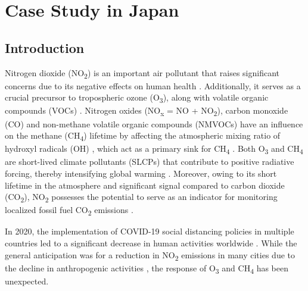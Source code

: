 \section{Case Study in Japan} \label{chap3_s2}

\subsection{Introduction}
Nitrogen dioxide (NO\textsubscript{2}) is an important air pollutant that raises significant concerns due to its negative effects on human health \citep{hamra2015lung}. Additionally, it serves as a crucial precursor to tropospheric ozone (O\textsubscript{3}), along with volatile organic compounds (VOCs) \citep{akimoto2022rethinking}. Nitrogen oxides (NO\textsubscript{x} = NO + NO\textsubscript{2}), carbon monoxide (CO) and non-methane volatile organic compounds (NMVOCs) have an influence on the methane (CH\textsubscript{4}) lifetime by affecting the atmospheric mixing ratio of hydroxyl radicals (OH) \citep{akimoto2022rethinking}, which act as a primary sink for CH\textsubscript{4} \citep{turner2019interpreting}. Both O\textsubscript{3} and CH\textsubscript{4} are short-lived climate pollutants (SLCPs) that contribute to positive radiative forcing, thereby intensifying global warming \citep{akimoto2022rethinking}. Moreover, owing to its short lifetime in the atmosphere and significant signal compared to carbon dioxide (CO\textsubscript{2}), NO\textsubscript{2} possesses the potential to serve as an indicator for monitoring localized fossil fuel CO\textsubscript{2} emissions \citep{miyazaki2023predictability}. \par

In 2020, the implementation of COVID-19 social distancing policies in multiple countries led to a significant decrease in human activities worldwide \citep{de2022overview}. While the general anticipation was for a reduction in NO\textsubscript{2} emissions in many cities due to the decline in anthropogenic activities \citep{bauwens2020impact,barre2021estimating,cooper2022global}, the response of O\textsubscript{3} and CH\textsubscript{4} has been unexpected.\par


